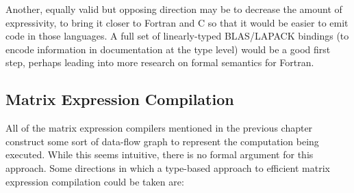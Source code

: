 Another, equally valid but opposing direction may be to decrease the amount of
expressivity, to bring it closer to Fortran and C so that it would be easier to
emit code in those languages. A full set of linearly-typed BLAS/LAPACK bindings
(to encode information in documentation at the type level) would be a good
first step, perhaps leading into more research on formal semantics for Fortran.

\subsection{Matrix Expression Compilation}

All of the matrix expression compilers mentioned in the previous chapter
construct some sort of data-flow graph to represent the computation being
executed. While this seems intuitive, there is no formal argument for this
approach.  Some directions in which a type-based approach to efficient matrix
expression compilation could be taken are:

